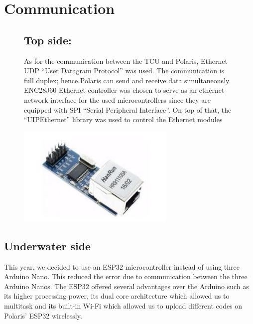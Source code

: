 \documentclass[a4paper,10pt]{article}
\renewcommand{\thesubsection}{\arabic{subsection}}
\begin{document}
	\section{Communication}
	\renewcommand{\thesubsection}{\Roman{subsection}}
	\begin{figure}[H]
		\begin{minipage}{0.65\textwidth}
			\subsection{Top side:}	
			As for the communication between the TCU and Polaris, Ethernet UDP “User 
			Datagram Protocol” was used. The communication is full duplex; hence 
			Polaris can send and receive data simultaneously. ENC28J60 Ethernet 
			controller was chosen to serve as an ethernet network interface for the used 
			microcontrollers since they are equipped with SPI “Serial Peripheral 
			Interface”. On top of that, the “UIPEthernet” library was used to control the 
			Ethernet modules
		\end{minipage}
		\hfill
		\begin{minipage}{0.3\textwidth} 
			\centering
			\includegraphics[width=\textwidth]{ethernet_module}
		\end{minipage}
	\end{figure}
	\subsection{Underwater side}
		This year, we decided to use an ESP32 microcontroller instead of using three Arduino Nano. 
		This reduced the error due to communication between the three Arduino Nanos. The ESP32 
		offered several advantages over the Arduino such as its higher processing power, its dual core 
		architecture which allowed us to multitask and its built-in Wi-Fi which allowed us to upload 
		different codes on Polaris’ ESP32 wirelessly.
	
\end{document}
